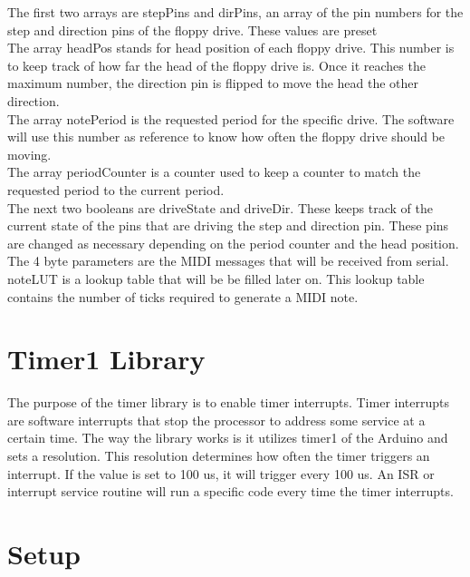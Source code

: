 \documentclass[11pt, a4paper]{report}
\begin{document}
The first two arrays are stepPins and dirPins, an array of the pin numbers for the step and direction pins of the floppy drive. These values are preset\\

The array headPos stands for head position of each floppy drive. This number is to keep track of how far the head of the floppy drive is. Once it reaches the maximum number, the direction pin is flipped to move the head the other direction. \\

The array notePeriod is the requested period for the specific drive. The software will use this number as reference to know how often the floppy drive should be moving.\\

The array periodCounter is a counter used to keep a counter to match the requested period to the current period. \\

The next two booleans are driveState and driveDir. These keeps track of the current state of the pins that are driving the step and direction pin. These pins are changed as necessary depending on the period counter and the head position. \\

The 4 byte parameters are the MIDI messages that will be received from serial. \\

noteLUT is a lookup table that will be be filled later on. This lookup table contains the number of ticks required to generate a MIDI note.

\section{Timer1 Library}

The purpose of the timer library is to enable timer interrupts. Timer interrupts are software interrupts that stop the processor to address some service at a certain time. The way the library works is it utilizes timer1 of the Arduino and sets a resolution. This resolution determines how often the timer triggers an interrupt. If the value is set to 100 us, it will trigger every 100 us. An ISR or interrupt service routine will run a specific code every time the timer interrupts. 

\section{Setup}
\end{document}
